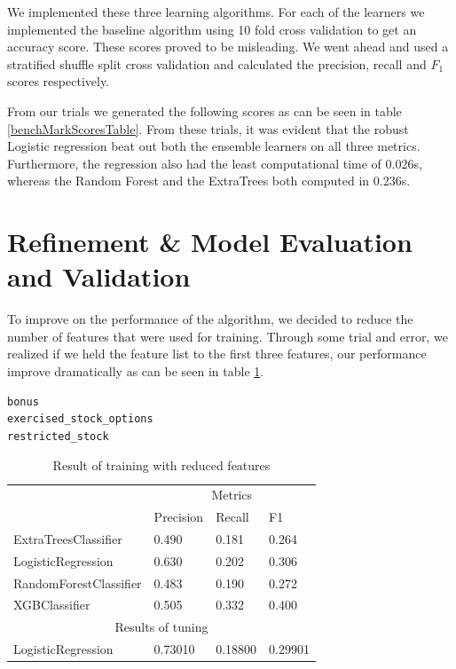 \documentclass[twoside,openright,titlepage,numbers=noenddot,headinclude,%
               footinclude=true,cleardoublepage=empty,abstractoff,BCOR=5mm,%
               paper=a4,fontsize=11pt,ngerman,american]{scrreprt}
\numberwithin{theorem}{chapter}
\numberwithin{definition}{chapter}
\numberwithin{algorithm}{chapter}
\numberwithin{figure}{chapter}
\numberwithin{table}{chapter}
\numberwithin{equation}{chapter}
\begin{document}
We implemented these three learning algorithms. For each of the learners we implemented the baseline algorithm using 10 fold cross validation to get an accuracy score. These scores proved to be misleading. We went ahead and used a stratified shuffle split cross validation and calculated the precision, recall and $F_1$ scores respectively.

From our trials we generated the following scores as can be seen in table \ref{benchMarkScoresTable}. From these trials, it was evident that the robust Logistic regression beat out both the ensemble learners on all three metrics. Furthermore, the regression also had the least computational time of 0.026s, whereas the Random Forest and the ExtraTrees both computed in 0.236s.


\section*{Refinement \& Model Evaluation and Validation}
To improve on the performance of the algorithm, we decided to reduce the number of features that were used for training. Through some trial and error, we realized if we held the feature list to the first three features, our performance improve dramatically as can be seen in table \ref{reducedFeaturesTable}.
\begin{verbatim}
bonus
exercised_stock_options
restricted_stock 
\end{verbatim}

\setlength{\extrarowheight}{1.5pt}
\begin{table}[!htbp]
\caption{Result of training with reduced features} %
\centering %
\begin{tabular}{|p{6cm}|p{1.5cm}|p{1.5cm}|p{1.5cm}|} %
\hline %
& \multicolumn{3}{c|}{Metrics}\\[5pt]
\cline{2-4} 
& Precision & Recall & F1\\[0.5ex]
\hline %

ExtraTreesClassifier     &  0.490       &  0.181     &  0.264     \\ 
LogisticRegression       &  0.630       &  0.202     &  0.306     \\ 
RandomForestClassifier   &  0.483       &  0.190     &  0.272     \\ 
XGBClassifier            &  0.505       &  0.332     &  0.400     \\ 
\hline%
\multicolumn{4}{|c|}{Results of tuning}\\[5pt]
\hline

LogisticRegression          &  0.73010  &0.18800  &0.29901\\ 
\hline
\end{tabular}
\label{reducedFeaturesTable}
\end{table}
\end{document}
